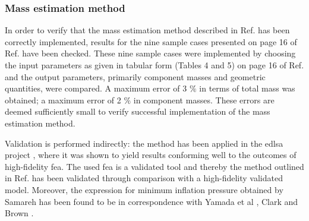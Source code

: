 \subsubsection{Mass estimation method}

In order to verify that the mass estimation method described in Ref.\cite{Samareh2011} has been correctly implemented, results for the nine sample cases presented on page 16 of Ref.\cite{Samareh2011} have been checked. These nine sample cases were implemented by choosing the input parameters as given in tabular form (Tables 4 and 5) on page 16 of Ref.\cite{Samareh2011} and the output parameters, primarily component masses and geometric quantities, were compared. A maximum error of 3 $\%$ in terms of total mass was obtained; a maximum error of 2 $\%$ in component masses. These errors are deemed sufficiently small to verify successful implementation of the mass estimation method.

Validation is performed indirectly: the method \cite{Samareh2011} has been applied in the \gls{edlsa} project \cite{Cianciolo2010}, where it was shown to yield results conforming well to the outcomes of high-fidelity \gls{fea}. The used \gls{fea} is a validated tool \cite{Cianciolo2010} and thereby the method outlined in Ref.\cite{Samareh2011} has been validated through comparison with a high-fidelity validated model. Moreover, the expression for minimum inflation pressure obtained by Samareh has been found to be in correspondence with Yamada et al \cite{Yamada2009}, Clark \cite{Clark2009} and Brown \cite{Brown2009}.




